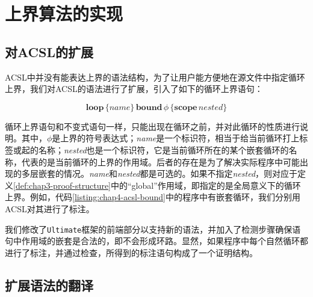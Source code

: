 \section{上界算法的实现}

\subsection{对ACSL的扩展}

ACSL中并没有能表达上界的语法结构，为了让用户能方便地在源文件中指定循环上界，我们对ACSL的语法进行了扩展，引入了如下的循环上界语句：

\[
\mathbf{loop} \, \{name\} \,\mathbf{bound} \,  \phi \, \{\mathbf{scope} \, nested\}
\]

循环上界语句和不变式语句一样，只能出现在循环之前，并对此循环的性质进行说明。其中，$\phi$是上界的符号表达式；\textit{name}是一个标识符，相当于给当前循环打上标签或起的名称；\textit{nested}也是一个标识符，它是当前循环所在的某个嵌套循环的名称，代表的是当前循环的上界的作用域。后者的存在是为了解决实际程序中可能出现的多层嵌套的情况。\textit{name}和\textit{nested}都是可选的。如果不指定\textit{nested}，则对应于定义\ref{def:chap3-proof-structure}中的“global”作用域，即指定的是全局意义下的循环上界。例如，代码\ref{listing:chap4-acsl-bound}中的程序中有嵌套循环，我们分别用ACSL对其进行了标注。


我们修改了\texttt{Ultimate}框架的前端部分以支持新的语法，并加入了检测步骤确保语句中作用域的嵌套是合法的，即不会形成环路。显然，如果程序中每个自然循环都进行了标注，并通过检查，所得到的标注语句构成了一个证明结构。

\subsection{扩展语法的翻译}

